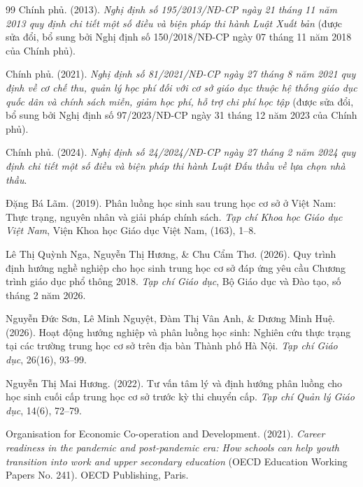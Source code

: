 \begin{thebibliography}{99}
Chính phủ. (2013). \textit{Nghị định số 195/2013/NĐ-CP ngày 21 tháng 11 năm 2013 quy định chi tiết một số điều và biện pháp thi hành Luật Xuất bản} (được sửa đổi, bổ sung bởi Nghị định số 150/2018/NĐ-CP ngày 07 tháng 11 năm 2018 của Chính phủ).

Chính phủ. (2021). \textit{Nghị định số 81/2021/NĐ-CP ngày 27 tháng 8 năm 2021 quy định về cơ chế thu, quản lý học phí đối với cơ sở giáo dục thuộc hệ thống giáo dục quốc dân và chính sách miễn, giảm học phí, hỗ trợ chi phí học tập} (được sửa đổi, bổ sung bởi Nghị định số 97/2023/NĐ-CP ngày 31 tháng 12 năm 2023 của Chính phủ).

Chính phủ. (2024). \textit{Nghị định số 24/2024/NĐ-CP ngày 27 tháng 2 năm 2024 quy định chi tiết một số điều và biện pháp thi hành Luật Đấu thầu về lựa chọn nhà thầu}.

Đặng Bá Lãm. (2019). Phân luồng học sinh sau trung học cơ sở ở Việt Nam: Thực trạng, nguyên nhân và giải pháp chính sách. \textit{Tạp chí Khoa học Giáo dục Việt Nam}, Viện Khoa học Giáo dục Việt Nam, (163), 1--8.

Lê Thị Quỳnh Nga, Nguyễn Thị Hương, \& Chu Cẩm Thơ. (2026). Quy trình định hướng nghề nghiệp cho học sinh trung học cơ sở đáp ứng yêu cầu Chương trình giáo dục phổ thông 2018. \textit{Tạp chí Giáo dục}, Bộ Giáo dục và Đào tạo, số tháng 2 năm 2026.

Nguyễn Đức Sơn, Lê Minh Nguyệt, Đàm Thị Vân Anh, \& Dương Minh Huệ. (2026). Hoạt động hướng nghiệp và phân luồng học sinh: Nghiên cứu thực trạng tại các trường trung học cơ sở trên địa bàn Thành phố Hà Nội. \textit{Tạp chí Giáo dục}, 26(16), 93--99.

Nguyễn Thị Mai Hương. (2022). Tư vấn tâm lý và định hướng phân luồng cho học sinh cuối cấp trung học cơ sở trước kỳ thi chuyển cấp. \textit{Tạp chí Quản lý Giáo dục}, 14(6), 72--79.

Organisation for Economic Co-operation and Development. (2021). \textit{Career readiness in the pandemic and post-pandemic era: How schools can help youth transition into work and upper secondary education} (OECD Education Working Papers No. 241). OECD Publishing, Paris.


\end{thebibliography}
